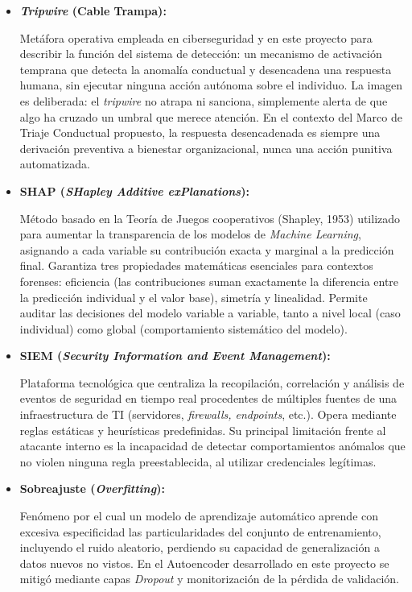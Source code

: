 \documentclass[IB]{TFUOC}%
\begin{document}
\begin{itemize}
    \item \textbf{\textit{Tripwire} (Cable Trampa):}
    
    Metáfora operativa empleada en ciberseguridad y en este proyecto para describir la función del sistema de detección: un mecanismo de activación temprana que detecta la anomalía conductual y desencadena una respuesta humana, sin ejecutar 
    ninguna acción autónoma sobre el individuo. La imagen es deliberada: el \textit{tripwire} no atrapa ni sanciona, simplemente alerta de que algo ha cruzado un umbral que merece atención. En el contexto del Marco de Triaje Conductual propuesto, la respuesta desencadenada es siempre una derivación preventiva a bienestar organizacional, nunca una acción punitiva automatizada.

    \item \textbf{SHAP (\textit{SHapley Additive exPlanations}):}
    
    Método basado en la Teoría de Juegos cooperativos (Shapley, 1953) utilizado para aumentar la transparencia de los modelos de \textit{Machine Learning}, asignando a cada variable su contribución exacta y marginal a la predicción final. Garantiza tres propiedades matemáticas esenciales para contextos forenses: eficiencia (las contribuciones suman exactamente la diferencia entre la predicción individual y el valor base), simetría y linealidad. Permite auditar las decisiones del modelo variable a variable, tanto a nivel local (caso individual) como global (comportamiento sistemático del modelo).

    \item \textbf{SIEM (\textit{Security Information and Event Management}):}
    
    Plataforma tecnológica que centraliza la recopilación, correlación y análisis de eventos de seguridad en tiempo real procedentes de múltiples fuentes de una infraestructura de TI (servidores, \textit{firewalls, endpoints}, etc.). Opera mediante reglas estáticas y heurísticas predefinidas. Su principal limitación frente al atacante interno es la incapacidad de detectar comportamientos anómalos que no violen ninguna regla preestablecida, al utilizar credenciales legítimas.

    \item \textbf{Sobreajuste (\textit{Overfitting}):}
    
    Fenómeno por el cual un modelo de aprendizaje automático aprende con excesiva especificidad las particularidades del conjunto de entrenamiento, incluyendo el ruido aleatorio, perdiendo su capacidad de generalización a datos nuevos no vistos. En el Autoencoder desarrollado en este proyecto se mitigó mediante capas \textit{Dropout} y monitorización de la pérdida de validación.


\end{itemize}
\end{document}
